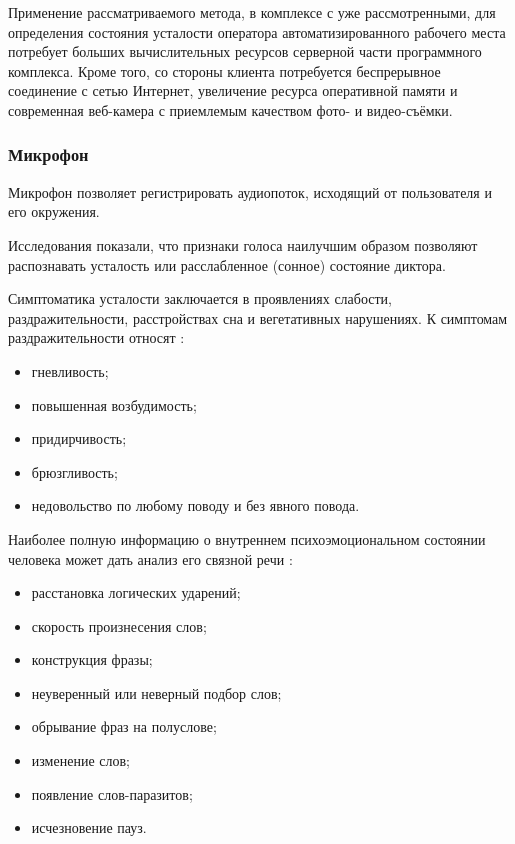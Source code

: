 Применение рассматриваемого метода, в комплексе с уже рассмотренными, для определения состояния усталости оператора автоматизированного рабочего места потребует больших вычислительных ресурсов серверной части программного комплекса. Кроме того, со стороны клиента потребуется беспрерывное соединение с сетью Интернет, увеличение ресурса оперативной памяти и современная веб-камера с приемлемым качеством фото- и видео-съёмки.

\subsubsection{Микрофон}
Микрофон позволяет регистрировать аудиопоток, исходящий от пользователя и его окружения.

Исследования показали, что признаки голоса наилучшим образом позволяют распознавать усталость или расслабленное (сонное) состояние диктора. \cite{recognitionOfPsycho} 

Симптоматика усталости заключается в проявлениях слабости, раздражительности, расстройствах сна и вегетативных нарушениях. К симптомам раздражительности относят \cite{medObozr}:
\begin{itemize}[leftmargin=1.6\parindent]
\item гневливость;
\item повышенная возбудимость;
\item придирчивость;
\item брюзгливость;
\item недовольство по любому поводу и без явного повода.
\end{itemize}


Наиболее полную информацию о внутреннем психоэмоциональном состоянии человека может дать анализ его связной речи \cite{voiceMethod}:
\begin{itemize}[leftmargin=1.6\parindent]
\item расстановка логических ударений;
\item скорость произнесения слов;
\item конструкция фразы;
\item неуверенный или неверный подбор слов;
\item обрывание фраз на полуслове;
\item изменение слов;
\item появление слов-паразитов;
\item исчезновение пауз. 
\end{itemize}

